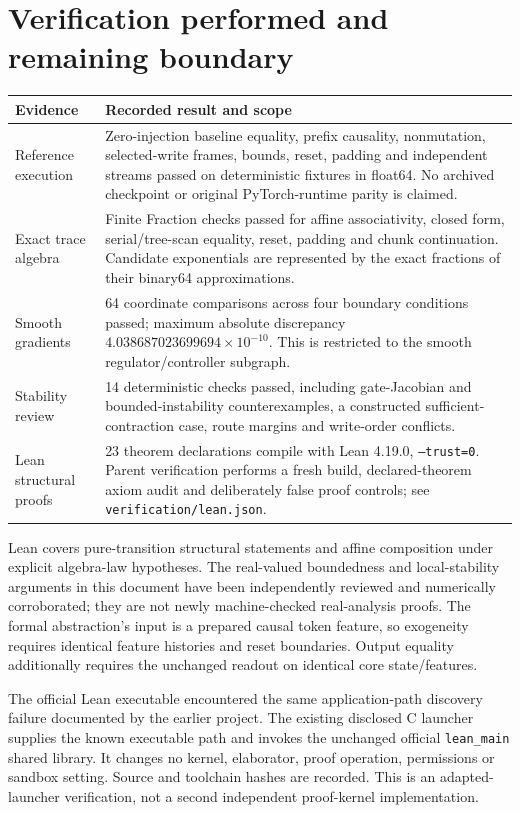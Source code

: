 \documentclass[11pt,a4paper]{article}
\begin{document}
\section{Verification performed and remaining boundary}
\begin{tabularx}{\linewidth}{@{}p{33mm}Y@{}}
\toprule
Evidence & Recorded result and scope\\ \midrule
Reference execution & Zero-injection baseline equality, prefix causality,
nonmutation, selected-write frames, bounds, reset, padding and independent
streams passed on deterministic fixtures in float64. No archived checkpoint
or original PyTorch-runtime parity is claimed.\\
Exact trace algebra & Finite Fraction checks passed for affine associativity,
closed form, serial/tree-scan equality, reset, padding and chunk continuation.
Candidate exponentials are represented by the exact fractions of their
binary64 approximations.\\
Smooth gradients & 64 coordinate comparisons across four boundary conditions
passed; maximum absolute discrepancy \(4.038687023699694\times10^{-10}\).
This is restricted to the smooth regulator/controller subgraph.\\
Stability review & 14 deterministic checks passed, including gate-Jacobian and
bounded-instability counterexamples, a constructed sufficient-contraction
case, route margins and write-order conflicts.\\
Lean structural proofs & 23 theorem declarations compile with Lean 4.19.0,
\texttt{--trust=0}. Parent verification performs a fresh build, declared-theorem
axiom audit and deliberately false proof controls; see
\texttt{verification/lean.json}.\\
\bottomrule
\end{tabularx}

Lean covers pure-transition structural statements and affine composition under
explicit algebra-law hypotheses. The real-valued boundedness and local-stability
arguments in this document have been independently reviewed and numerically
corroborated; they are not newly machine-checked real-analysis proofs. The
formal abstraction's input is a prepared causal token feature, so exogeneity
requires identical feature histories and reset boundaries. Output equality
additionally requires the unchanged readout on identical core state/features.

The official Lean executable encountered the same application-path discovery
failure documented by the earlier project. The existing disclosed C launcher
supplies the known executable path and invokes the unchanged official
\texttt{lean\_main} shared library. It changes no kernel, elaborator, proof
operation, permissions or sandbox setting. Source and toolchain hashes are
recorded. This is an adapted-launcher verification, not a second independent
proof-kernel implementation.
\end{document}
